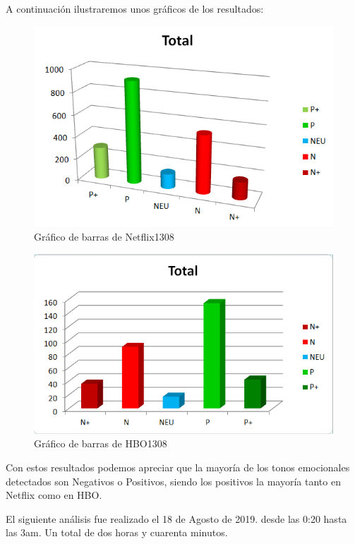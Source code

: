 A continuación ilustraremos unos gráficos de los resultados: 

\begin{figure}[H]
	\centering
	\includegraphics[scale=.3]{imagenes/GraficoBarrasNetflix1308.PNG}
	\caption{Gráfico de barras de Netflix1308}
	\label{fig:barrasNetflix1308}
\end{figure}


\begin{figure}[H]
	\centering
	\includegraphics[scale=.3]{imagenes/barrasHBO1308.PNG}
	\caption{Gráfico de barras de HBO1308}
	\label{fig:barrasHBO1308}
\end{figure}

Con estos resultados podemos apreciar que la mayoría de los tonos emocionales detectados son Negativos o Positivos, siendo los positivos la mayoría tanto en Netflix como en HBO. 


El siguiente análisis fue realizado el 18 de Agosto de 2019. desde las 0:20 hasta las 3am. Un total de dos horas y cuarenta minutos. 

